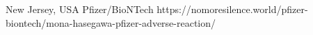           {New Jersey, USA}
          {}
          {Pfizer/BioNTech}
          {}
          {
          }
          {https://nomoresilence.world/pfizer-biontech/mona-hasegawa-pfizer-adverse-reaction/}
